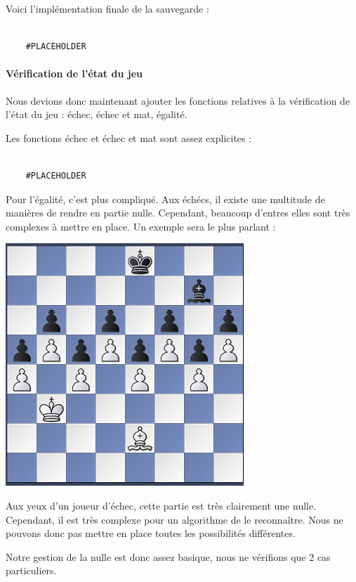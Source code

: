 \documentclass{article}
\begin{document}
Voici l'implémentation finale de la sauvegarde :
\begin{verbatim}

    #PLACEHOLDER
\end{verbatim}

\paragraph{Vérification de l'état du jeu}
Nous devions donc maintenant ajouter les fonctions relatives à la vérification de l'état du jeu
: échec, échec et mat, égalité. 

Les fonctions échec et échec et mat sont assez explicites :
\begin{verbatim}

    #PLACEHOLDER
\end{verbatim}

Pour l'égalité, c'est plus compliqué.
Aux échécs, il existe une multitude de manières de rendre en partie nulle. Cependant, beaucoup d'entres elles sont 
très complexes à mettre en place. Un exemple sera le plus parlant : 

\includegraphics{exempledraw}

Aux yeux d'un joueur d'échec, cette partie est très clairement une nulle.
Cependant, il est très complexe pour un algorithme de le reconnaître.
Nous ne pouvons donc pas mettre en place toutes les possibilités différentes.

Notre gestion de la nulle est donc assez basique, nous ne vérifions que 2 cas particuliers.
\end{document}
